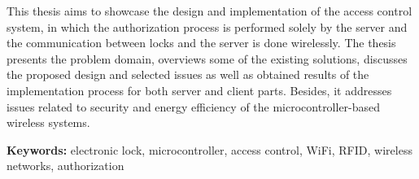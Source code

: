 	This thesis aims to showcase the design and implementation of the access control system, in which the authorization process is performed solely by the server and the communication between locks and the server is done wirelessly. The thesis presents the problem domain, overviews some of the existing solutions, discusses the proposed design and selected issues as well as obtained results of the implementation process for both server and client parts. Besides, it addresses issues related to security and energy efficiency of the microcontroller-based wireless systems.

	\textbf{Keywords:} electronic lock, microcontroller, access control, WiFi, RFID, wireless networks, authorization